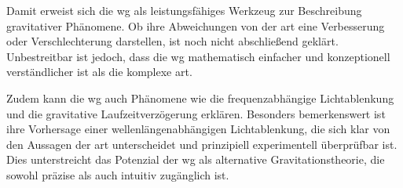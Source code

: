 Damit erweist sich die \gls{wg} als leistungsfähiges Werkzeug zur Beschreibung gravitativer Phänomene. Ob ihre Abweichungen von der \gls{art} eine Verbesserung oder Verschlechterung
darstellen, ist noch nicht abschließend geklärt. Unbestreitbar ist jedoch, dass die \gls{wg} mathematisch einfacher und konzeptionell verständlicher ist als die komplexe \gls{art}.

Zudem kann die \gls{wg} auch Phänomene wie die frequenzabhängige Lichtablenkung und die gravitative Laufzeitverzögerung erklären. Besonders bemerkenswert ist ihre Vorhersage einer
wellenlängenabhängigen Lichtablenkung, die sich klar von den Aussagen der \gls{art} unterscheidet und prinzipiell experimentell überprüfbar ist. Dies unterstreicht das Potenzial
der \gls{wg} als alternative Gravitationstheorie, die sowohl präzise als auch intuitiv zugänglich ist.
